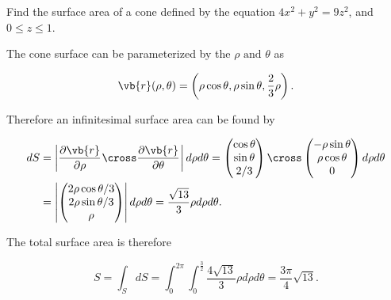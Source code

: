 \documentclass[english,a4paper,12pt]{report}
\begin{document}
{Find the surface area of a cone defined by the equation \(4x^2+y^2=9z^2\), and \(0 \le z \le 1\).  }
{The cone surface can be parameterized by the \(\rho \text { and } \theta \) as

\begin{equation}
	\vb{r} (\rho ,\theta) = \left(\rho \cos \theta ,\rho \sin \theta ,\frac{2}{3}\rho  \right).
\end{equation}

Therefore an infinitesimal surface area can be found by 

\begin{equation}
	\begin{aligned} 
	dS &= \left| \frac{\partial \vb{r} }{\partial \rho } _{} \cross  \frac{\partial \vb{r} }{\partial \theta }_{} \right| d\rho d\theta  = \begin{pmatrix}
		 \cos \theta  \\
		 \sin \theta  \\
		 2/3  \\
	\end{pmatrix} \cross \begin{pmatrix}
		 -\rho \sin \theta  \\
		 \rho \cos \theta  \\
		 0 \\
	\end{pmatrix} d \rho d \theta \\
	&= \left| \begin{pmatrix}
		 2\rho \cos  \theta /3  \\
		 2\rho \sin \theta /3  \\
		 \rho  \\
	\end{pmatrix} \right| d \rho d \theta = \frac{\sqrt{13} }{3} \rho d \rho d \theta .  
	\end{aligned} 
\end{equation}

The total surface area is therefore 

\begin{equation}
	S = \int_{S}^{} dS = \int_{0}^{2\pi } \int_{0}^{\frac{3}{2} } \frac{4\sqrt{13} }{3} \rho d \rho d \theta = \frac{3\pi }{4} \sqrt{13}.    
\end{equation}
} 
\end{document}
